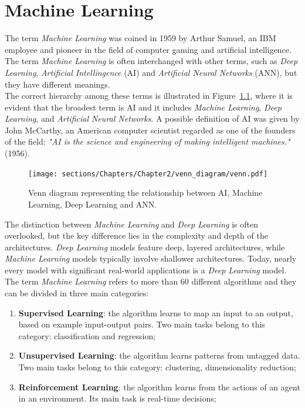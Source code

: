 
\chapter{Machine Learning}

The term \textit{Machine Learning} was coined in 1959 by Arthur Samuel, an IBM employee and pioneer in the field of computer gaming and 
artificial intelligence.
The term \textit{Machine Learning} is often interchanged with other terms, such as \textit{Deep Learning}, \textit{Artificial Intellingence} (AI) 
and \textit{Artificial Neural Networks} (ANN), but they have different meanings.\\
The correct hierarchy among these terms is illustrated in Figure~\ref{fig:venn-AI}, where it is evident that the broadest term is AI and it includes 
\textit{Machine Learning}, \textit{Deep Learning}, and \textit{Artificial Neural Networks}.
A possible definition of AI was given by John McCarthy, an American computer scientist regarded as one of the founders of the field: 
\textit{"AI is the science and engineering of making intelligent machines."} (1956).

\begin{figure}[h]
\centering
\texttt{[image: sections/Chapters/Chapter2/venn\_diagram/venn.pdf]}
\caption{Venn diagram representing the relationship between AI, Machine Learning, Deep Learning and ANN.}
\label{fig:venn-AI}
\end{figure}

The distinction between \textit{Machine Learning} and \textit{Deep Learning} is often overlooked, but the key difference lies 
in the complexity and depth of the architectures. \textit{Deep Learning} models feature deep, layered architectures, while \textit{Machine Learning}
models typically involve shallower architectures. Today, nearly every model with significant real-world applications is a \textit{Deep Learning} model.\\

The term \textit{Machine Learning} refers to more than 60 different algorithms and they can be divided in three main categories: 

\begin{enumerate}

\item \textbf{Supervised Learning}: the algorithm learns to map an input to an output,  based on example input-output pairs.
Two main tasks belong to this category: classification and regression;
\item \textbf{Unsupervised Learning}: the algorithm learns patterns from untagged data.
Two main tasks belong to this category: clustering, dimensionality reduction;
\item \textbf{Reinforcement Learning}: the algorithm learns from the actions of an agent in an environment.
Its main task is real-time decisions;

\end{enumerate}

